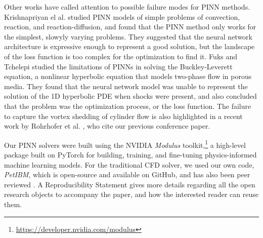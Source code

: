 Other works have called attention to possible failure modes for PINN methods. Krishnapriyan el al. \cite{krishnapriyan_failure_2021} studied PINN models of simple problems of convection, reaction, and reaction-diffusion, and found that the PINN method only works for the simplest, slowyly varying problems.
They suggested that the neural network architecture is expressive enough to represent a good solution, but the landscape of the loss function is too complex for the optimization to find it. 
Fuks and Tchelepi \cite{fuks_limitations_2020} studied the limitations of PINNs in solving the Buckley-Leverett equation, a nonlinear hyperbolic equation that models two-phase flow in porous media. 
They found that the neural network model was unable to represent the solution of the 1D hyperbolic PDE when shocks were present, and also concluded that the problem was the optimization process, or the loss function.
The failure to capture the vortex shedding of cylinder flow is also highlighted in a recent work by Rohrhofer et al. \cite{rohrhofer_fixedpoints_2023}, who cite our previous conference paper. 

Our PINN solvers were built using the NVIDIA \emph{Modulus} toolkit,\footnote{\url{https://developer.nvidia.com/modulus}} a high-level package built on PyTorch for building, training, and fine-tuning physics-informed machine learning models.
For the traditional CFD solver, we used our own code, \emph{PetIBM}, which is open-source and available on GitHub, and has also been peer reviewed \cite{chuang_petibm_2018}. 
A Reproducibility Statement gives more details regarding all the open research objects to accompany the paper, and how the interested reader can reuse them.

